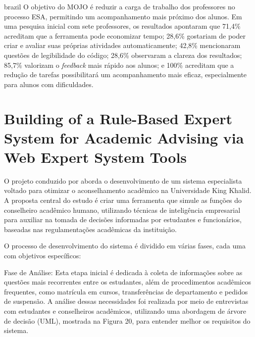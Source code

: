 \begin{otherlanguage*}{brazil}
O objetivo do MOJO é reduzir a carga de trabalho dos professores no processo ESA, permitindo um acompanhamento mais próximo dos alunos. Em uma pesquisa inicial com sete professores, os resultados apontaram que 71,4\% acreditam que a ferramenta pode economizar tempo; 28,6\% gostariam de poder criar e avaliar suas próprias atividades automaticamente; 42,8\% mencionaram questões de legibilidade do código; 28,6\% observaram a clareza dos resultados; 85,7\% valorizam o \textit{feedback} mais rápido aos alunos; e 100\% acreditam que a redução de tarefas possibilitará um acompanhamento mais eficaz, especialmente para alunos com dificuldades.


\section{Building of a Rule-Based Expert System for Academic Advising via Web Expert System Tools}

O projeto conduzido por \textcite{osmannasr} aborda o desenvolvimento de um sistema especialista voltado para otimizar o aconselhamento acadêmico na Universidade King Khalid. A proposta central do estudo é criar uma ferramenta que simule as funções do conselheiro acadêmico humano, utilizando técnicas de inteligência empresarial para auxiliar na tomada de decisões informadas por estudantes e funcionários, baseadas nas regulamentações acadêmicas da instituição.

O processo de desenvolvimento do sistema é dividido em várias fases, cada uma com objetivos específicos:

Fase de Análise: Esta etapa inicial é dedicada à coleta de informações sobre as questões mais recorrentes entre os estudantes, além de procedimentos acadêmicos frequentes, como matrícula em cursos, transferências de departamento e pedidos de suspensão. A análise dessas necessidades foi realizada por meio de entrevistas com estudantes e conselheiros acadêmicos, utilizando uma abordagem de árvore de decisão (UML), mostrada na Figura 20, para entender melhor os requisitos do sistema.


\end{otherlanguage*}
